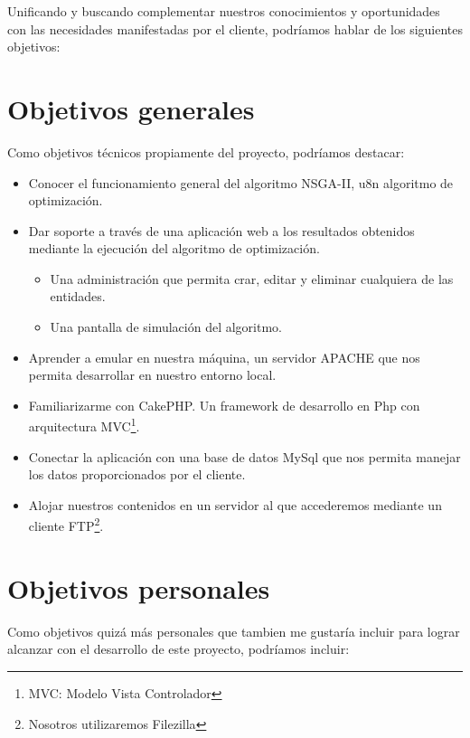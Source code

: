 
Unificando y buscando complementar nuestros conocimientos y oportunidades con las necesidades manifestadas por el cliente, podríamos hablar de los siguientes objetivos:

\section{Objetivos generales}

Como objetivos técnicos propiamente del proyecto, podríamos destacar:

\begin{itemize}
	\item Conocer el funcionamiento general del algoritmo NSGA-II, u8n algoritmo de optimización.
	
	\item Dar soporte a través de una aplicación web a los resultados obtenidos mediante la ejecución del algoritmo de optimización.
	\begin{itemize}
		\item Una administración que permita crar, editar y eliminar cualquiera de las entidades.
		\item Una pantalla de simulación del algoritmo.
	\end{itemize}
	\item Aprender a emular en nuestra máquina, un servidor APACHE que nos permita desarrollar en nuestro entorno local.
	
	\item Familiarizarme con CakePHP. Un framework de desarrollo en Php con arquitectura MVC\footnote{MVC: Modelo Vista Controlador}.
	
	\item Conectar la aplicación con una base de datos MySql que nos permita manejar los datos proporcionados por el cliente.
	
	\item Alojar nuestros contenidos en un servidor al que accederemos mediante un cliente FTP\footnote{Nosotros utilizaremos Filezilla}.
\end{itemize}

\section{Objetivos personales}

Como objetivos quizá más personales que tambien me gustaría incluir para lograr alcanzar con el desarrollo de este proyecto, podríamos incluir:

